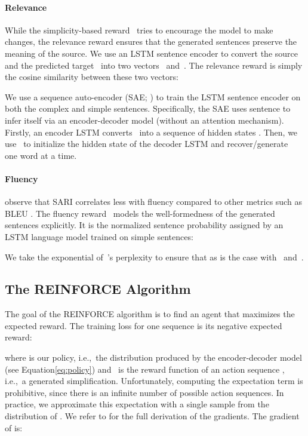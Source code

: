 \documentclass[11pt,letterpaper]{article}
\begin{document}
\paragraph{Relevance} While the simplicity-based reward~ tries to
encourage the model to make changes, the relevance reward 
ensures that the generated sentences preserve the meaning of the
source. We use an LSTM sentence encoder to convert the source~ and
the predicted target~ into two vectors~
and~. The relevance reward  is simply the
cosine similarity between these two vectors:



We use a sequence auto-encoder (SAE; \citealt{dai2015semi}) to train
the LSTM sentence encoder on both the complex and simple
sentences. Specifically, the SAE uses sentence 
to infer itself via an encoder-decoder model (without an attention
mechanism).  Firstly, an encoder LSTM converts~ into a sequence of
hidden states . Then, we
use~ to initialize the hidden state of the decoder
LSTM and recover/generate~ one word at a time. 


\paragraph{Fluency}  observe that SARI correlates
less with fluency compared to other metrics such as BLEU
\cite{papineni:2002}.  The fluency reward~ models the
well-formedness of the generated sentences explicitly. It is the
normalized sentence probability assigned by an LSTM language model
trained on simple sentences:

We take the exponential of~'s perplexity to ensure that
\mbox{} as is the case with~ and~.



\subsection{The REINFORCE Algorithm}
The goal of the REINFORCE algorithm is to find an agent that maximizes
the expected reward. The training loss for one sequence is its 
negative expected reward:

where  is our policy, i.e.,~the distribution produced by the
encoder-decoder model (see Equation\eqref{eq:policy}) and
~is the reward function of an action sequence
, i.e.,~a generated
simplification. Unfortunately, computing the expectation term is
prohibitive, since there is an infinite number of possible action
sequences. In practice, we approximate this expectation with a single
sample from the distribution of . We refer to
 for the full derivation of the
gradients. The gradient of  is:
\end{document}
